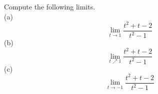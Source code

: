 Compute the following limits.\\
(a)
\begin{equation*}
  \lim_{t\rightarrow 1} \frac{t^2+t-2}{t^2-1}
\end{equation*}
(b)
\begin{equation*}
  \lim_{t\nearrow 1} \frac{t^2+t-2}{t^2-1}
\end{equation*}
(c)
\begin{equation*}
  \lim_{t\rightarrow -1} \frac{t^2+t-2}{t^2-1}
\end{equation*}
